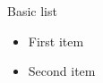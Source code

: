 \documentclass[14pt,t]{beamer}
\begin{document}
\begin{frame}{Basic list}
\begin{itemize}
\item First item
\item Second item
\end{itemize}
\end{frame}
\end{document}
